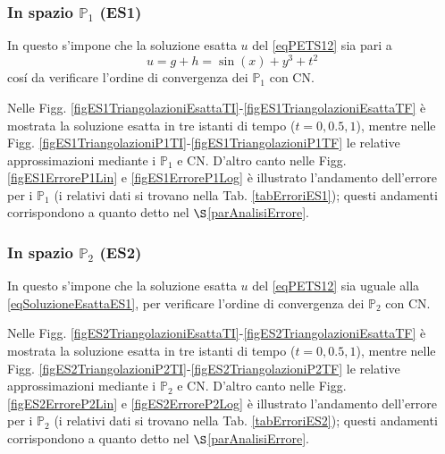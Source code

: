 \documentclass{article}
\newcommand{\SpaziaturaMate}[3]{
    \setlength{\thinmuskip}{#1mu}
    \setlength{\medmuskip}{#2mu}
    \setlength{\thickmuskip}{#3mu}
}
\begin{document}
            
            \subsubsection{In spazio \texorpdfstring{$\mathbb P_1$}{P1} (ES1)}

                In questo s'impone che la soluzione esatta $u$ del \eqref{eqPETS12} sia pari a
                \begin{equation}
                    u=g+h=\sin(x)+y^3+t^2
                    \label{eqSoluzioneEsattaES1}
                \end{equation}
                cosí da verificare l'ordine di convergenza dei $\mathbb P_1$ con CN.

                {\SpaziaturaMate{1}{2}{3}
                Nelle Figg. \ref{figES1TriangolazioniEsattaTI}-\ref{figES1TriangolazioniEsattaTF} è mostrata la soluzione esatta in tre istanti di tempo ($t=0,0.5,1$), mentre nelle Figg. \ref{figES1TriangolazioniP1TI}-\ref{figES1TriangolazioniP1TF} le relative approssimazioni mediante i $\mathbb P_1$ e CN. D'altro canto nelle Figg. \ref{figES1ErroreP1Lin} e \ref{figES1ErroreP1Log} è illustrato l'andamento dell'errore per i $\mathbb P_1$ (i relativi dati si trovano nella Tab. \ref{tabErroriES1}); questi andamenti corrispondono a quanto detto nel $\S$\ref{parAnalisiErrore}.}
                
            
            \subsubsection{In spazio \texorpdfstring{$\mathbb P_2$}{P2} (ES2)}

                In questo s'impone che la soluzione esatta $u$ del \eqref{eqPETS12} sia uguale alla \eqref{eqSoluzioneEsattaES1}, per verificare l'ordine di convergenza dei $\mathbb P_2$ con CN.

                {\SpaziaturaMate{1}{2}{3}
                Nelle Figg. \ref{figES2TriangolazioniEsattaTI}-\ref{figES2TriangolazioniEsattaTF} è mostrata la soluzione esatta in tre istanti di tempo ($t=0,0.5,1$), mentre nelle Figg. \ref{figES2TriangolazioniP2TI}-\ref{figES2TriangolazioniP2TF} le relative approssimazioni mediante i $\mathbb P_2$ e CN. D'altro canto nelle Figg. \ref{figES2ErroreP2Lin} e \ref{figES2ErroreP2Log} è illustrato l'andamento dell'errore per i $\mathbb P_2$ (i relativi dati si trovano nella Tab. \ref{tabErroriES2}); questi andamenti corrispondono a quanto detto nel $\S$\ref{parAnalisiErrore}.}
                
\end{document}

